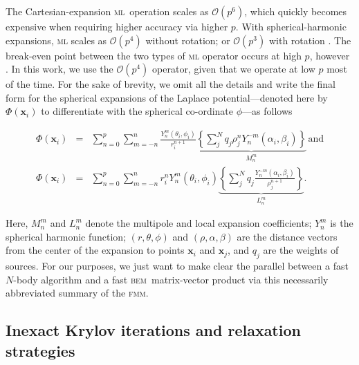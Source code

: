 \documentclass[smallcondensed,final]{svjour3}
\newcommand{\bem}{\textsc{bem}\xspace}
\newcommand{\fmm}{\textsc{fmm}\xspace}
\renewcommand{\O}[1]{\mathcal{O}(#1)}
\newcommand{\mtol}{\textsc{m}\texttwooldstyle\textsc{l}\xspace} %
\newcommand{\vect}[1]{\mathbf{#1}}
\begin{document}
The Cartesian-expansion \mtol\ operation scales as $\O{p^{6}}$, which quickly becomes expensive when requiring higher accuracy via higher $p$. 
With spherical-harmonic expansions, \mtol scales as $\O{p^{4}}$ without rotation; or $\O{p^{3}}$ with rotation \cite{ChengETal1999}. The break-even point between the two types of \mtol operator occurs at high $p$, however \cite{white1996rotating}. In this work, we use the $\O{p^{4}}$ operator, given that we operate at low $p$ most of the time.
For the sake of brevity, we omit all the details and write the final form for the spherical expansions of the Laplace potential---denoted here by $\Phi(\vect{x}_i)$ to differentiate with the spherical co-ordinate $\phi$---as follows

\begin{eqnarray}
	\Phi(\vect{x}_i) & = & \sum_{n=0}^{p}\sum_{m=-n}^{n}\frac{Y^{m}_n(\theta_i,\phi_i)}{r_i^{n+1}}\underbrace{\left \{ \sum_j^{N}q_j\rho^{n}_jY^{-m}_n(\alpha_i,\beta_i)\right \} }_{M^{m}_n} \, \text{and}\\
	\Phi(\vect{x}_i) & = & \sum_{n=0}^{p}\sum_{m=-n}^{n}r_i^{n}Y^{m}_n(\theta_i,\phi_i)\underbrace{\left \{ \sum_j^{N}q_j\frac{Y^{-m}_n(\alpha_i,\beta_i)}{\rho^{n+1}_j}\right \} }_{L^{m}_n}.
\end{eqnarray}

\noindent
Here, $M^{m}_n$ and $L^{m}_n$ denote the multipole and local expansion coefficients; $Y_{n}^{m}$ is the spherical harmonic function; $(r,\theta,\phi)$ and $(\rho,\alpha,\beta)$ are the distance vectors from the center of the expansion to points $\vect{x}_i$ and $\vect{x}_j$, and $q_j$ are the weights of sources. For our purposes, we just want to make clear the parallel between a fast $N$-body algorithm and a fast \bem\ matrix-vector product via this necessarily abbreviated summary of the \fmm.

\subsection{Inexact Krylov iterations and relaxation strategies}
\end{document}
